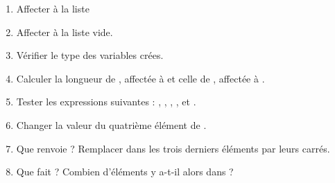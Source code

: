 \question{}
\begin{enumerate}[label = \emph{\alph*)}]
  \item Affecter à  la liste \pyv{[2,5,3,-1,7,2,1]}
  \item Affecter à  la liste vide.
  \item Vérifier le type des variables crées.
  \item Calculer la longueur de , affectée à  et celle de , affectée à .
  \item Tester les expressions suivantes : , , , ,  et .
  \item Changer la valeur du quatrième élément de .
  \item Que renvoie  ? Remplacer dans  les trois derniers éléments par leurs carrés.
  \item Que fait  ? Combien d'éléments y a-t-il alors dans  ?
\end{enumerate}